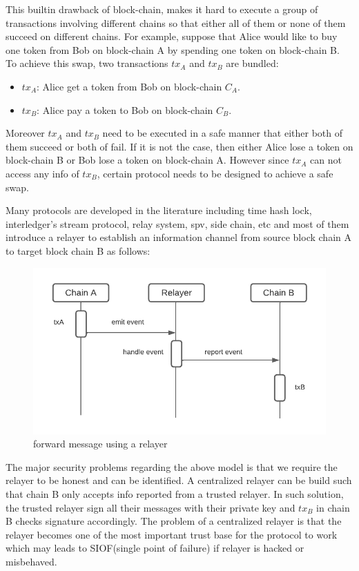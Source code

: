 \documentclass[pageno]{jpaper}
\begin{document}
This builtin drawback of block-chain, makes it hard to execute a group of transactions involving different chains so that either all of them or none of them succeed on different chains. For example, suppose that Alice would like to buy one token from Bob on block-chain A by spending one token on block-chain B. To achieve this swap, two transactions $tx_A$ and $tx_B$ are bundled:
\begin{itemize}[leftmargin=*]
\item $tx_A$: Alice get a token from Bob on block-chain $C_A$.
\item $tx_B$: Alice pay a token to Bob on block-chain $C_B$.
\end{itemize}
Moreover $tx_A$ and $tx_B$ need to be executed in a safe manner that either both of them succeed or both of fail. If it is not the case, then either Alice lose a token on block-chain B or Bob lose a token on block-chain A. However since $tx_A$ can not access any info of $tx_B$, certain protocol needs to be designed to achieve a safe swap.

Many protocols are developed in the literature including time hash lock, interledger’s stream protocol, relay system, spv, side chain, etc and most of them introduce a relayer to establish an information channel from source block chain A to target block chain B as follows:
\begin{figure}[h]
\caption{forward message using a relayer}
\label{relayer-connection}
\includegraphics[scale=0.6]{relayer}
\end{figure}

The major security problems regarding the above model is that we require the relayer to be honest and can be identified. A centralized relayer can be build such that chain B only accepts info reported from a trusted relayer. In such solution, the trusted relayer sign all their messages with their private key and $tx_B$ in chain B checks signature accordingly. The problem of a centralized relayer is that the relayer becomes one of the most important trust base for the protocol to work which may leads to SIOF(single point of failure) if relayer is hacked or misbehaved.
\end{document}
